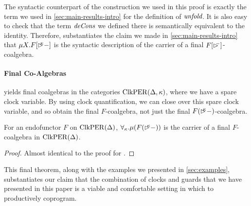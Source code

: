 The syntactic counterpart of the construction we used in this proof is
exactly the term we used in \autoref{sec:main-results-intro} for the
definition of $\textit{unfold}$. It is also easy to check that the term
$\textit{deCons}$ we defined there is semantically equivalent to the
identity. Therefore,  substantiates
the claim we made in \autoref{sec:main-results-intro} that $\mu
X. F[\mathord{\rhd\kern-0.4em^{\kappa}}-]$ is the syntactic description of the carrier of a
final $F[\mathord{\rhd\kern-0.4em^{-}}]$-coalgebra.

\paragraph{Final Co-Algebras}  yields
final coalgebras in the categories $\mathrm{ClkPER}(\Delta, \kappa)$, where we
have a spare clock variable. By using clock quantification, we can
close over this spare clock variable, and so obtain the final
$F$-coalgebra, not just the final $F(\mathord{\rhd\kern-0.4em^{\kappa}}-)$-coalgebra.

\begin{theorem}\label{thm:final-f-coalgebra}
  For an endofunctor $F$ on $\mathrm{ClkPER}(\Delta)$, $\forall_\kappa. \mu
  (F(\mathord{\rhd\kern-0.4em^{\kappa}}-))$ is the carrier of a final $F$-coalgebra in
  $\mathrm{ClkPER}(\Delta)$.
\end{theorem}

\begin{proof}
  Almost identical to the proof for .
\end{proof}

This final theorem, along with the examples we presented in
\autoref{sec:examples}, substantiates our claim that the combination
of clocks and guards that we have presented in this paper is a viable
and comfortable setting in which to productively coprogram.

